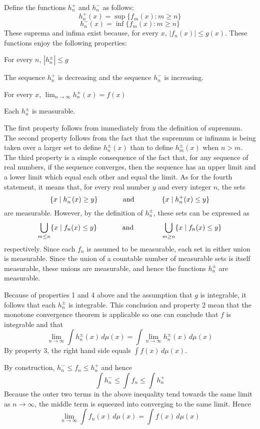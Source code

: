 \documentclass[12pt]{article}
\begin{document}
Define the functions $h_n^+$ and $h_n^-$ as follows:
 $$h_n^+ (x) = \sup \{f_m (x) \colon m \ge n\}$$
 $$h_n^- (x) = \inf \{f_m (x) \colon m \ge n\}$$
These suprema and infima exist because, for every $x$, $|f_n (x)|
\le g(x)$.  These functions enjoy the following properties:

For every $n$, $|h_n^\pm| \le g$

The sequence $h_n^+$ is decreasing and the sequence $h_n^-$ is increasing.

For every $x$, $\lim_{n \to \infty} h_n^\pm (x) = f(x)$

Each $h_n^\pm$ is measurable.

The first property follows from immediately from the definition of
supremum.  The second property follows from the fact that the
supremum or infimum is being taken over a larger set to define
$h_n^\pm (x)$ than to define $h_m^\pm (x)$ when $n > m$.  The third
property is a simple consequence of the fact that, for any sequence
of real numbers, if the sequence converges, then the sequence has an
upper limit and a lower limit which equal each other and equal the
limit.  As for the fourth statement, it means that, for every real
number $y$ and every integer $n$, the sets
 $$\{x \mid h_n^- (x) \ge y\} \hbox{\hskip 0.5in and \hskip 0.5in}
 \{x \mid h_n^+ (x) \le y\}$$
are measurable.  However, by the definition of $h_n^\pm$, these sets
can be expressed as
 $$\bigcup_{m \le n} \{x \mid f_n (x) \le y\} \hbox{\hskip 0.5in and
  \hskip 0.5in} \bigcup_{m \ge n} \{x \mid f_n (x) \le y\}$$
respectively. Since each $f_n$ is assumed to be measurable, each set
in either union is measurable.  Since the union of a countable
number of measurable sets is itself measurable, these unions are
measurable, and hence the functions $h_n^\pm$ are measurable.

Because of properties 1 and 4 above and the assumption that $g$ is
integrable, it follows that each $h_n^\pm$ is integrable.  This
conclusion and property 2 mean that the monotone convergence theorem
is applicable so one can conclude that $f$ is integrable and that
 $$\lim_{n \to \infty} \int h_n^\pm (x) \,d\mu(x) = \int \lim_{n \to \infty}
  h_n^\pm (x) \,d\mu(x)$$
By property 3, the right hand side equals $\int f(x) \,d\mu(x)$.

By construction, $h_n^- \le f_n \le h_n^+$ and hence
 $$\int h_n^- \le \int f_n \le \int h_n^+$$
Because the outer two terms in the above inequality tend towards the
same limit as $n \to \infty$, the middle term is squeezed into
converging to the same limit.  Hence
 $$\lim_{n \to \infty} \int f_n (x) \,d\mu(x) = \int f (x) \,d\mu(x)$$
\end{document}
